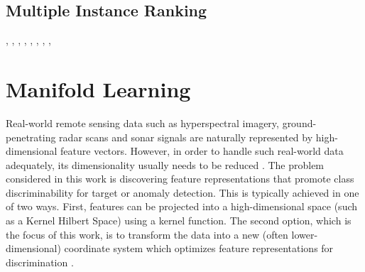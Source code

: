 \subsection{Multiple Instance Ranking}


\cite{Hu2008MIRanking}, \cite{Bergeron2012FastBundleMILRanking}, \cite{Bergeron2008MIRanking}, \cite{Latham2015MIFeatureRankingThesis} \cite{Asif2017LargeMarginMIRanking} , \cite{Aiolli2004LearningPreferences}, \cite{Chu2005LearningPreferencesWithGaussianProcesses}, \cite{Dekel2004Ranking}, \cite{Furnkranz2003RankingSummary}, 

\section{Manifold Learning}

Real-world remote sensing data such as hyperspectral imagery, ground-penetrating radar scans and sonar signals are naturally represented by high-dimensional feature vectors.  However, in order to handle such real-world data adequately, its dimensionality usually needs to be reduced \citep{VanDerMaaten2009DRReview,Belkin2004SemiSupLearningRiemannianManifolds}. The problem considered in this work is discovering feature representations that promote class discriminability for target or anomaly detection.  This is typically achieved in one of two ways.  First, features can be projected into a high-dimensional space (such as a Kernel Hilbert Space) using a kernel function. The second option, which is the focus of this work, is to transform the data into a new (often lower-dimensional) coordinate system which optimizes feature representations for discrimination \citep{Vural2018StudySupervisedManifoldLearning}.


